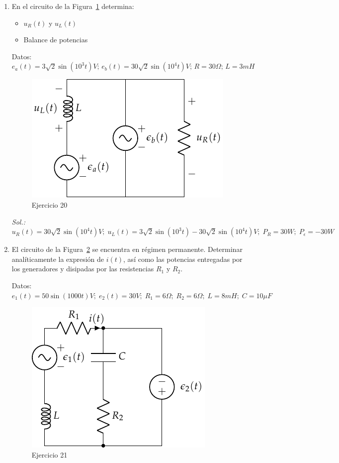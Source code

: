 \begin{enumerate}
    \item En el circuito de la Figura~\ref{fig.superposicion2_ej} determina:
\begin{itemize}
\item $u_R(t)$  y $u_L(t)$
\item Balance de potencias
\end{itemize}
Datos: $e_a(t) = {3\sqrt{2} \sin(10^3 t)} V;\,e_b(t) = {30\sqrt{2} \sin(10^4 t)} V;\,R = {30}{\Omega};\,L = {3}{mH}$
\begin{figure}[H]
    \centering
    \includegraphics{../figs/superposicion2_ej.pdf}
    \caption{Ejercicio 20}
    \label{fig.superposicion2_ej}
\end{figure}
\emph{Sol.: $u_R(t) =  30\sqrt{2}\sin(10^4 t) V;\; u_L(t) = 3\sqrt{2}\sin(10^3 t) - 30\sqrt{2}\sin(10^4 t) V;\; P_R = {30}{W};\; P_\epsilon = {-30}{W}$}

\item El circuito de la Figura~\ref{fig.ej21_BT2} se encuentra en régimen permanente. Determinar analíticamente la expresión de $i(t)$, así como las potencias entregadas por los generadores y disipadas por las resistencias $R_1$ y $R_2$.

Datos: $e_1(t) = {50 \sin(1000 t)} V;\; e_2(t) = {30}{V};\; R_1 = {6}{\Omega};\; R_2 = {6}{\Omega};\; L = {8}{mH};\; C = {10}{\mu F}$

\begin{figure}[H]
    \centering
    \includegraphics{../figs/superposicion1_ej.pdf}
    \caption{Ejercicio 21}
    \label{fig.ej21_BT2}
\end{figure}


\end{enumerate}
